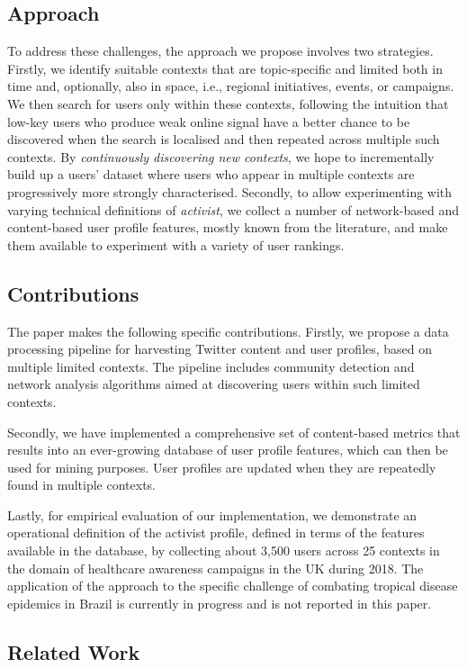 \subsection{Approach}

To address these challenges, the approach we propose involves two strategies. 
Firstly, we identify suitable contexts that are topic-specific and limited both in time and, optionally, also in space, i.e., regional initiatives, events, or campaigns.
We then search for users only within these contexts, following the intuition that low-key users who produce weak online signal have a better chance to be discovered when the search is localised and then repeated across multiple such contexts.
By \textit{continuously discovering new contexts}, we hope to incrementally build up a users' dataset where users who appear in multiple contexts are progressively more strongly characterised.
%
Secondly, to allow experimenting with varying technical definitions of \textit{activist}, we collect a number of network-based and content-based user profile features, mostly known from the literature, and make them available to experiment with a variety of user rankings.

\subsection{ Contributions}
The paper makes the following specific contributions.
%
Firstly, we propose a data processing pipeline for harvesting Twitter content and user profiles, based on multiple limited contexts. 
The pipeline includes community detection and network analysis algorithms aimed at discovering users within such limited contexts.

Secondly, we have implemented a comprehensive set of content-based metrics that results into an ever-growing database of user profile features, which can then be used for mining purposes. 
User profiles are updated when they are repeatedly found in multiple contexts.

Lastly, for empirical evaluation of our implementation, we demonstrate an operational definition of the activist profile, defined in terms of the features available in the database, by collecting about 3,500 users  across 25 contexts in the domain of healthcare awareness campaigns in the UK during 2018. 
The application of the approach to the specific challenge of combating tropical disease epidemics in Brazil is currently in progress and is not reported in this paper.

\subsection{Related Work}  \label{sec:related}

